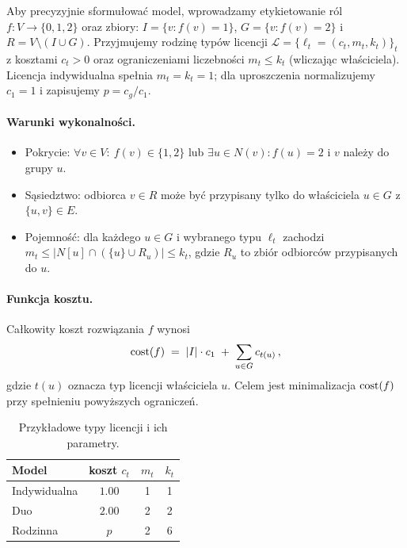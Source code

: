 \noindent Aby precyzyjnie sformułować model, wprowadzamy etykietowanie ról $f:V\to\{0,1,2\}$ oraz zbiory: $I=\{v:f(v)=1\}$, $G=\{v:f(v)=2\}$ i $R=V\setminus(I\cup G)$. Przyjmujemy rodzinę typów licencji $\mathcal{L}=\{\ell_t=(c_t,m_t,k_t)\}_t$ z kosztami $c_t>0$ oraz ograniczeniami liczebności $m_t\le k_t$ (wliczając właściciela). Licencja indywidualna spełnia $m_t=k_t=1$; dla uproszczenia normalizujemy $c_1=1$ i zapisujemy $p=c_g/c_1$.

\paragraph{Warunki wykonalności.}
\begin{itemize}
  \item Pokrycie: $\forall v\in V:\ f(v)\in\{1,2\}$ lub $\exists u\in N(v): f(u)=2$ i $v$ należy do grupy $u$.
  \item Sąsiedztwo: odbiorca $v\in R$ może być przypisany tylko do właściciela $u\in G$ z $\{u,v\}\in E$.
  \item Pojemność: dla każdego $u\in G$ i wybranego typu $\ell_t$ zachodzi $m_t\le |N[u]\cap (\{u\}\cup R_u)|\le k_t$, gdzie $R_u$ to zbiór odbiorców przypisanych do $u$.
\end{itemize}

\paragraph{Funkcja kosztu.}
Całkowity koszt rozwiązania $f$ wynosi
\[
  \operatorname{cost}(f)\;=\;|I|\cdot c_1\; +\; \sum_{u\in G} c_{t(u)}\, ,
\]
gdzie $t(u)$ oznacza typ licencji właściciela $u$. Celem jest minimalizacja $\operatorname{cost}(f)$ przy spełnieniu powyższych ograniczeń.

\begin{table}[h]
\centering
\begin{tabular}{@{}lccc@{}}
\toprule
Model & koszt $c_t$ & $m_t$ & $k_t$ \\
\midrule
Indywidualna & $1.00$ & 1 & 1 \\
Duo          & $2.00$ & 2 & 2 \\
Rodzinna     & $p$    & 2 & 6 \\
\bottomrule
\end{tabular}
\caption{Przykładowe typy licencji i ich parametry.}
\label{tab:license_models}
\end{table}


